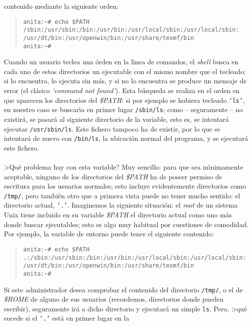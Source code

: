 contenido mediante la siguiente orden:
\begin{quote}
\begin{verbatim}
anita:~# echo $PATH
/sbin:/usr/sbin:/bin:/usr/bin:/usr/local/sbin:/usr/local/sbin:
/usr/dt/bin:/usr/openwin/bin:/usr/share/texmf/bin
anita:~# 
\end{verbatim}
\end{quote}
Cuando un usuario teclea una \'orden en la l\'{\i}nea de comandos, el {\it 
shell} busca en cada uno de estos directorios un ejecutable con el mismo 
nombre que el tecleado; si lo encuentra, lo ejecuta sin m\'as, y si no lo 
encuentra se produce un mensaje de error (el cl\'asico {\it `command not 
found'}). Esta b\'usqueda se realiza en el orden en que aparecen los 
directorios del {\it \$PATH}: si por ejemplo se hubiera tecleado {\tt `ls'}, 
en nuestro caso se buscar\'{\i}a en primer lugar {\tt /sbin/ls}; como -- 
seguramente -- no existir\'a, se pasar\'a al siguiente directorio de la 
variable, esto es, se intentar\'a ejecutar {\tt /usr/sbin/ls}. Este fichero
tampoco ha de existir, por lo que se intentar\'a de nuevo con {\tt /bin/ls},
la ubicaci\'on normal del programa, y se ejecutar\'a este fichero.\\
\\>Qu\'e problema hay con esta variable? Muy sencillo: para que sea 
m\'{\i}nimamente aceptable, ninguno de los directorios del {\it \$PATH} ha de
poseer permiso de escritura para los usuarios normales; esto incluye 
evidentemente directorios como {\tt /tmp/}, pero tambi\'en otro que a primera
vista puede no tener mucho sentido: el directorio actual, {\tt `.'}. Imaginemos
la siguiente situaci\'on: el {\it root} de un sistema Unix tiene incluido en su 
variable {\it \$PATH} el directorio actual como uno m\'as donde buscar 
ejecutables; esto es algo muy habitual por cuestiones de comodidad. Por ejemplo,
la variable de entorno puede tener el siguiente contenido:
\begin{quote}
\begin{verbatim}
anita:~# echo $PATH
.:/sbin:/usr/sbin:/bin:/usr/bin:/usr/local/sbin:/usr/local/sbin:
/usr/dt/bin:/usr/openwin/bin:/usr/share/texmf/bin
anita:~#
\end{verbatim}
\end{quote}
Si este administrador desea comprobar el contenido del directorio {\tt /tmp/},
o el de {\it \$HOME} de alguno de sus usuarios (recordemos, directorios donde
pueden escribir), seguramente ir\'a a dicho directorio y ejecutar\'a un simple
{\tt ls}. Pero, >qu\'e sucede si el {\tt `.'} est\'a en primer lugar en la
